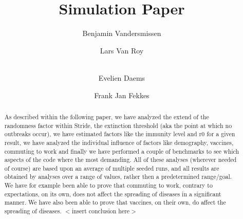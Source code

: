 \documentclass[runningheads]{llncs}
\begin{document}
	\title{Simulation Paper}
	
	\author{Benjamin Vandersmissen \and
		Lars Van Roy \and \\
		Evelien Daems \and
		Frank Jan Fekkes}
	\maketitle              %
	\begin{abstract}
		As described within the following paper, we have analyzed the extend of the randomness factor within Stride, the extinction threshold (aka the point at which no outbreaks occur), we have estimated factors like the immunity level and r0 for a given result, we have analyzed the individual influence of factors like demography, vaccines, commuting to work and finally we have performed a couple of benchmarks to see which aspects of the code where the most demanding. All of these analyses (wherever needed of course) are based upon an average of multiple seeded runs, and all results are obtained by analyses over a range of values, rather then a predetermined range/goal. We have for example been able to prove that commuting to work, contrary to expectations, on its own, does not affect the spreading of diseases in a significant manner. We have also been able to prove that vaccines, on their own, do affect the spreading of diseases. $<$insert conclusion here$>$
		
		
	\end{abstract}
	
	
\end{document}

